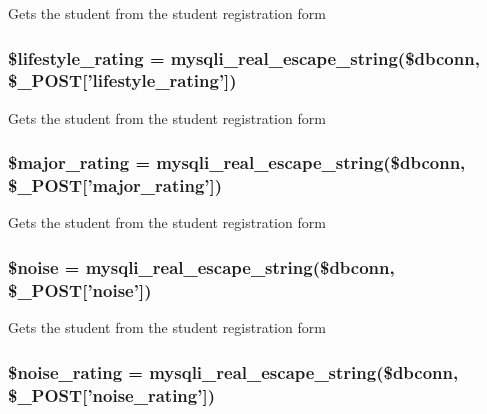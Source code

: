 \-Gets the student from the student registration form \hypertarget{admin__view_2validate_2studentVal_8php_aeaacae1f81e4a03e1332c1e322315730}{
\subsubsection[{\$lifestyle\-\_\-rating}]{\setlength{\rightskip}{0pt plus 5cm}\$lifestyle\-\_\-rating = mysqli\-\_\-real\-\_\-escape\-\_\-string(\$dbconn, \$\-\_\-\-P\-O\-S\-T\mbox{[}'lifestyle\-\_\-rating'\mbox{]})}}\label{admin__view_2validate_2studentVal_8php_aeaacae1f81e4a03e1332c1e322315730}
\-Gets the student from the student registration form \hypertarget{admin__view_2validate_2studentVal_8php_a658e327f04cd3d91c4a064f7f496ccef}{
\subsubsection[{\$major\-\_\-rating}]{\setlength{\rightskip}{0pt plus 5cm}\$major\-\_\-rating = mysqli\-\_\-real\-\_\-escape\-\_\-string(\$dbconn, \$\-\_\-\-P\-O\-S\-T\mbox{[}'major\-\_\-rating'\mbox{]})}}\label{admin__view_2validate_2studentVal_8php_a658e327f04cd3d91c4a064f7f496ccef}
\-Gets the student from the student registration form \hypertarget{admin__view_2validate_2studentVal_8php_a2774f17621ab4d3b64411f86c88df407}{
\subsubsection[{\$noise}]{\setlength{\rightskip}{0pt plus 5cm}\$noise = mysqli\-\_\-real\-\_\-escape\-\_\-string(\$dbconn, \$\-\_\-\-P\-O\-S\-T\mbox{[}'noise'\mbox{]})}}\label{admin__view_2validate_2studentVal_8php_a2774f17621ab4d3b64411f86c88df407}
\-Gets the student from the student registration form \hypertarget{admin__view_2validate_2studentVal_8php_a92d14fe0154487caa69f117986fb08da}{
\subsubsection[{\$noise\-\_\-rating}]{\setlength{\rightskip}{0pt plus 5cm}\$noise\-\_\-rating = mysqli\-\_\-real\-\_\-escape\-\_\-string(\$dbconn, \$\-\_\-\-P\-O\-S\-T\mbox{[}'noise\-\_\-rating'\mbox{]})}}\label{admin__view_2validate_2studentVal_8php_a92d14fe0154487caa69f117986fb08da}
